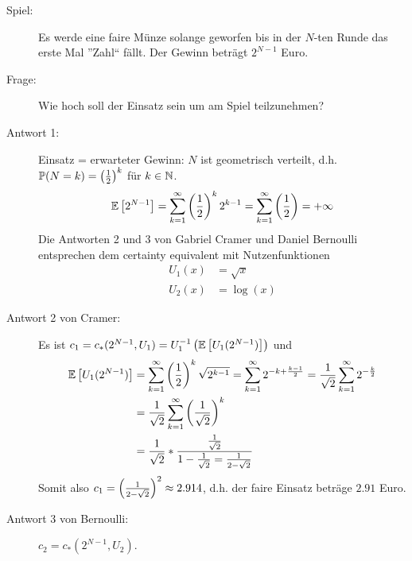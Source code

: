 


\begin{description}
	\item[Spiel:] Es werde eine faire Münze solange geworfen bis in der $N$-ten Runde das erste Mal ''Zahl`` fällt. Der Gewinn beträgt $2^{N-1}$ Euro.
	\item[Frage:] Wie hoch soll der Einsatz sein um am Spiel teilzunehmen?
	\item[Antwort 1:] Einsatz = erwarteter Gewinn: $N$ ist geometrisch verteilt, d.h. $\mathbb{P}(N = k) = \left( \frac{1}{2} \right)^k$ für $k \in \mathbb{N}$.
	\begin{equation*}
		\mathbb{E} \left[ 2^{N-1} \right] 
		= \sum_{k=1}^\infty \left( \frac{1}{2} \right)^k 2^{k-1} 
		= \sum_{k=1}^\infty \left( \frac{1}{2} \right) 
		= + \infty
	\end{equation*}
	Die Antworten 2 und 3 von Gabriel Cramer und Daniel Bernoulli entsprechen dem certainty equivalent mit Nutzenfunktionen
	\begin{align*}
			U_1(x) &= \sqrt{x} \tag{Cramer} \\
			U_2(x) &= \log(x) \tag{Bernoulli}
	\end{align*}
	\item[Antwort 2 von Cramer:] Es ist $c_1 = c_\ast (2^{N-1}, U_1) = U_1^{-1} \left( \mathbb{E} \left[ U_1(2^{N-1}) \right] \right)$ und
	\begin{equation*}
		\begin{aligned}
			\mathbb{E} \left[ U_1(2^{N-1}) \right] 
			&= \sum_{k=1}^\infty \left( \frac{1}{2} \right)^k \sqrt{2^{k-1}} 
			= \sum_{k=1}^\infty 2^{-k + \frac{k-1}{2}} 
			= \frac{1}{\sqrt{2}} \sum_{k=1}^\infty 2^{-\frac{k}{2}} \\
			&= \frac{1}{\sqrt{2}} \sum_{k = 1}^\infty \left( \frac{1}{\sqrt{2}} \right)^k \\
			&= \frac{1}{\sqrt{2}} * \frac{\frac{1}{\sqrt{2}}}{1 - \frac{1}{\sqrt{2}} = \frac{1}{2 - \sqrt{2}}}
		\end{aligned}
	\end{equation*}
	Somit also $c_1 = \left( \frac{1}{2-\sqrt{2}} \right)^2 \approx 2.914$, d.h. der faire Einsatz beträge $2.91$ Euro.
	\item[Antwort 3 von Bernoulli:] $c_2 = c_\ast (2^{N-1}, U_2)$.
	\begin{equation*}
		\begin{aligned}

\end{aligned}
\end{equation*}
\end{description}
